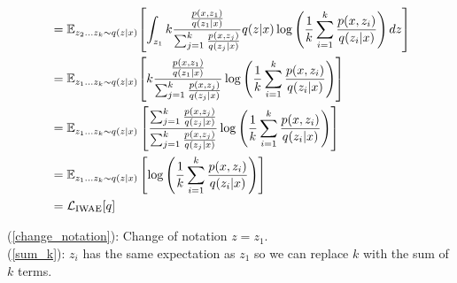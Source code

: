 \documentclass{article} %
\begin{document}
\begin{align}
    &= \mathbb{E}_{z_{2} \dots z_{k} \sim q(z|x)} \!\left[\int_{z_1}  k \frac{\frac{p(x,z_1)}{q(z_1|x)}}{\sum_{j=1}^k \frac{p(x,z_j)}{q(z_j|x)}} q(z|x) \log\left(\frac{1}{k}   \sum_{i=1}^k \frac{p(x,z_i)}{q(z_i|x)} \right)  dz \right] \label{change_notation} \\
    &= \mathbb{E}_{z_{1} \dots z_{k} \sim q(z|x)} \!\left[ k  \frac{\frac{p(x,z_1)}{q(z_1|x)}}{\sum_{j=1}^k \frac{p(x,z_j)}{q(z_j|x)}}  \log\left(\frac{1}{k}   \sum_{i=1}^k \frac{p(x,z_i)}{q(z_i|x)} \right)   \right]  \\
    &= \mathbb{E}_{z_{1} \dots z_{k} \sim q(z|x)} \left[  \frac{\sum_{j=1}^k \frac{p(x,z_j)}{q(z_j|x)}}{\sum_{j=1}^k \frac{p(x,z_j)}{q(z_j|x)}}  \log\left(\frac{1}{k}   \sum_{i=1}^k \frac{p(x,z_i)}{q(z_i|x)} \right)  \right] \label{sum_k} \\
    &= \mathbb{E}_{z_{1} \dots z_{k} \sim q(z|x)} \left[  \log\left(\frac{1}{k}   \sum_{i=1}^k \frac{p(x,z_i)}{q(z_i|x)} \right)  \right]  \\
    &= \mathcal{L}_{\textnormal{IWAE}}[q] 
  \end{align}


(\ref{change_notation}): Change of notation $z = z_1$.\\
(\ref{sum_k}): $z_i$ has the same expectation as $z_1$ so we can replace $k$ with the sum of $k$ terms.



\newpage









\end{document}

